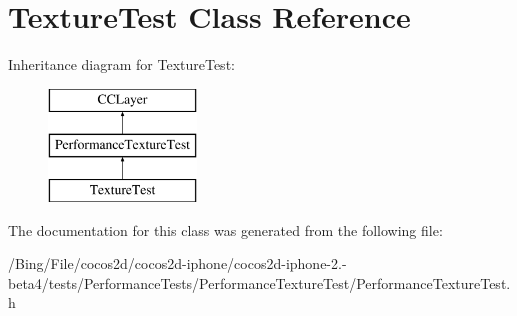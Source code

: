 \hypertarget{interface_texture_test}{\section{Texture\-Test Class Reference}
\label{interface_texture_test}
}
Inheritance diagram for Texture\-Test\-:\begin{figure}[H]
\begin{center}
\leavevmode
\includegraphics[height=3.000000cm]{interface_texture_test}
\end{center}
\end{figure}


The documentation for this class was generated from the following file\-:\begin{DoxyCompactItemize}
\item 
/\-Bing/\-File/cocos2d/cocos2d-\/iphone/cocos2d-\/iphone-\/2.-\/beta4/tests/\-Performance\-Tests/\-Performance\-Texture\-Test/Performance\-Texture\-Test.\-h\end{DoxyCompactItemize}
